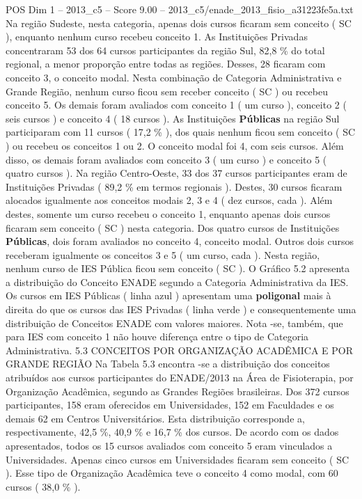 \begin{textsample}{POS Dim 1 – 2013\_c5 – Score 9.00 – 2013\_c5/enade\_2013\_fisio\_a31223fe5a.txt}
Na região Sudeste, nesta categoria, apenas dois cursos ficaram sem conceito ( SC ), enquanto nenhum curso recebeu conceito 1.
As Instituições Privadas concentraram 53 dos 64 cursos participantes da região Sul, 82,8 \% do total regional, a menor proporção entre todas as regiões.
Desses, 28 ficaram com conceito 3, o conceito modal.
Nesta combinação de Categoria Administrativa e Grande Região, nenhum curso ficou sem receber conceito ( SC ) ou recebeu conceito 5.
Os demais foram avaliados com conceito 1 ( um curso ), conceito 2 ( seis cursos ) e conceito 4 ( 18 cursos ).
As Instituições \textbf{Públicas} na região Sul participaram com 11 cursos ( 17,2 \% ), dos quais nenhum ficou sem conceito ( SC ) ou recebeu os conceitos 1 ou 2.
O conceito modal foi 4, com seis cursos.
Além disso, os demais foram avaliados com conceito 3 ( um curso ) e conceito 5 ( quatro cursos ).
Na região Centro-Oeste, 33 dos 37 cursos participantes eram de Instituições Privadas ( 89,2 \% em termos regionais ).
Destes, 30 cursos ficaram alocados igualmente aos conceitos modais 2, 3 e 4 ( dez cursos, cada ).
Além destes, somente um curso recebeu o conceito 1, enquanto apenas dois cursos ficaram sem conceito ( SC ) nesta categoria.
Dos quatro cursos de Instituições \textbf{Públicas}, dois foram avaliados no conceito 4, conceito modal.
Outros dois cursos receberam igualmente os conceitos 3 e 5 ( um curso, cada ).
Nesta região, nenhum curso de IES Pública ficou sem conceito ( SC ).
O Gráfico 5.2 apresenta a distribuição do Conceito ENADE segundo a Categoria Administrativa da IES.
Os cursos em IES Públicas ( linha azul ) apresentam uma \textbf{poligonal} mais à direita do que os cursos das IES Privadas ( linha verde ) e consequentemente uma distribuição de Conceitos ENADE com valores maiores.
Nota -se, também, que para IES com conceito 1 não houve diferença entre o tipo de Categoria Administrativa. 5.3 CONCEITOS POR ORGANIZAÇÃO ACADÊMICA E POR GRANDE REGIÃO Na Tabela 5.3 encontra -se a distribuição dos conceitos atribuídos aos cursos participantes do ENADE/2013 na Área de Fisioterapia, por Organização Acadêmica, segundo as Grandes Regiões brasileiras.
Dos 372 cursos participantes, 158 eram oferecidos em Universidades, 152 em Faculdades e os demais 62 em Centros Universitários.
Esta distribuição corresponde a, respectivamente, 42,5 \%, 40,9 \% e 16,7 \% dos cursos.
De acordo com os dados apresentados, todos os 15 cursos avaliados com conceito 5 eram vinculados a Universidades.
Apenas cinco cursos em Universidades ficaram sem conceito ( SC ).
Esse tipo de Organização Acadêmica teve o conceito 4 como modal, com 60 cursos ( 38,0 \% ).

\end{textsample}
